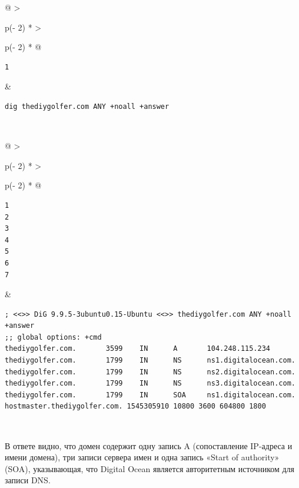 \documentclass{article}
\begin{document}
\begin{longtable}[]{@{}
  >{\raggedright\arraybackslash}p{(\columnwidth - 2\tabcolsep) * }
  >{\raggedright\arraybackslash}p{(\columnwidth - 2\tabcolsep) * }@{}}
\toprule
\endhead
\begin{minipage}[t]{\linewidth}\raggedright
\begin{verbatim}
1
\end{verbatim}
\end{minipage} & \begin{minipage}[t]{\linewidth}\raggedright
\begin{verbatim}
dig thediygolfer.com ANY +noall +answer
\end{verbatim}
\end{minipage} \\ \addlinespace
\bottomrule
\end{longtable}

\begin{longtable}[]{@{}
  >{\raggedright\arraybackslash}p{(\columnwidth - 2\tabcolsep) * }
  >{\raggedright\arraybackslash}p{(\columnwidth - 2\tabcolsep) * }@{}}
\toprule
\endhead
\begin{minipage}[t]{\linewidth}\raggedright
\begin{verbatim}
1
2
3
4
5
6
7
\end{verbatim}
\end{minipage} & \begin{minipage}[t]{\linewidth}\raggedright
\begin{verbatim}
; <<>> DiG 9.9.5-3ubuntu0.15-Ubuntu <<>> thediygolfer.com ANY +noall +answer
;; global options: +cmd
thediygolfer.com.       3599    IN      A       104.248.115.234
thediygolfer.com.       1799    IN      NS      ns1.digitalocean.com.
thediygolfer.com.       1799    IN      NS      ns2.digitalocean.com.
thediygolfer.com.       1799    IN      NS      ns3.digitalocean.com.
thediygolfer.com.       1799    IN      SOA     ns1.digitalocean.com. hostmaster.thediygolfer.com. 1545305910 10800 3600 604800 1800
\end{verbatim}
\end{minipage} \\ \addlinespace
\bottomrule
\end{longtable}

В ответе видно, что домен содержит одну запись A (сопоставление
IP-адреса и имени домена), три записи сервера имен и одна запись «Start
of authority» (SOA), указывающая, что Digital Ocean является
авторитетным источником для записи DNS.
\end{document}
